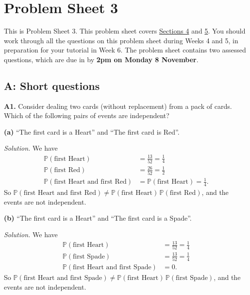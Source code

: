 \documentclass[
  a4paper,
]{book}
\newif\ifcomm\commtrue
\theoremstyle{definition}
\theoremstyle{definition}
\theoremstyle{definition}
\theoremstyle{definition}
\theoremstyle{remark}
\begin{document}
\hypertarget{P3}{%
\chapter*{Problem Sheet 3}\label{P3}}

\commfalse

This is Problem Sheet 3. This problem sheet covers \protect\hyperlink{S04-conditional}{Sections 4} and \protect\hyperlink{S05-discrete-rv}{5}. You should work through all the questions on this problem sheet during Weeks 4 and 5, in preparation for your tutorial in Week 6. The problem sheet contains two assessed questions, which are due in by \textbf{2pm on Monday 8 November}.

\hypertarget{P3-short}{%
\section*{A: Short questions}\label{P3-short}}

\textbf{A1.} Consider dealing two cards (without replacement) from a pack of cards. Which of the following pairs of events are independent?

\textbf{(a)} ``The first card is a Heart'' and ``The first card is Red''.

\begin{myanswers}
\emph{Solution.}
We have
\begin{align*}
\mathbb P(\text{first Heart}) &= \frac{13}{52} = \frac14 \\
\mathbb P(\text{first Red}) &= \frac{26}{52} = \frac12 \\
\mathbb P(\text{first Heart and first Red}) &= \mathbb P(\text{first Heart}) = \frac14 .
\end{align*}
So \(\mathbb P(\text{first Heart and first Red}) \neq \mathbb P(\text{first Heart})\,\mathbb P(\text{first Red})\), and the events are not independent.

\end{myanswers}

\textbf{(b)} ``The first card is a Heart'' and ``The first card is a Spade''.

\begin{myanswers}
\emph{Solution.}
We have
\begin{align*}
\mathbb P(\text{first Heart}) &= \frac{13}{52} = \frac14 \\
\mathbb P(\text{first Spade}) &= \frac{13}{52} = \frac14 \\
\mathbb P(\text{first Heart and first Spade}) &= 0 .
\end{align*}
So \(\mathbb P(\text{first Heart and first Spade}) \neq \mathbb P(\text{first Heart})\,\mathbb P(\text{first Spade})\), and the events are not independent.

\end{myanswers}
\end{document}
